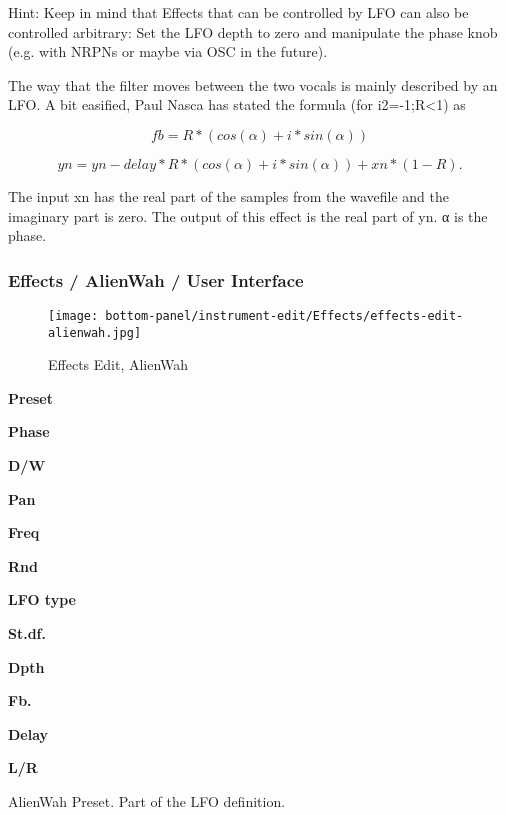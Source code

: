    Hint: Keep in mind that Effects that can be controlled by LFO can also be
   controlled arbitrary: Set the LFO depth to zero and manipulate the phase
   knob (e.g. with NRPNs or maybe via OSC in the future).

   The way that the filter moves between the two vocals is mainly described
   by an LFO. A bit easified, Paul Nasca has stated the formula (for
         i2=-1;R<1) as

   \[fb=R*(cos(α)+i*sin(α))\]

   \[yn=yn-delay*R*(cos(α)+i*sin(α))+xn*(1-R).\]

   The input xn has the real part of the samples from the wavefile and the
   imaginary part is zero. The output of this effect is the real part of yn.
   α is the phase.

\subsubsection{Effects / AlienWah / User Interface}
\label{subsubsec:effects_edit_alienwah_ui}

\begin{figure}[H]
   \centering 
   \texttt{[image: bottom-panel/instrument-edit/Effects/effects-edit-alienwah.jpg]}
   \caption{Effects Edit, AlienWah}
   \label{fig:effects_edit_alienwah}
\end{figure}

   \begin{enumber}
      \item \textbf{Preset}
      \item \textbf{Phase}
      \item \textbf{D/W}
      \item \textbf{Pan}
      \item \textbf{Freq}
      \item \textbf{Rnd}
      \item \textbf{LFO type}
      \item \textbf{St.df.}
      \item \textbf{Dpth}
      \item \textbf{Fb.}
      \item \textbf{Delay}
      \item \textbf{L/R}
   \end{enumber}

   \setcounter{ItemCounter}{0}      %

   AlienWah Preset.
   Part of the LFO definition.

